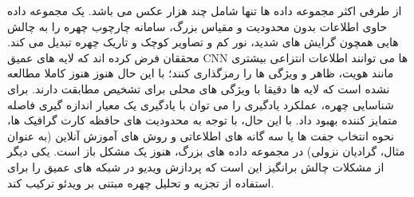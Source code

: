 از طرفی اکثر مجموعه داده ها تنها شامل چند هزار عکس می باشد. یک مجموعه داده حاوی اطلاعات بدون محدودیت و مقیاس بزرگ، سامانه چارچوب چهره را به چالش هایی همچون گرایش های شدید، نور کم و تصاویر کوچک و تاریک چهره تبدیل می کند. محققان فرض کرده اند که لایه های عمیق CNN ها می توانند اطلاعات انتزاعی بیشتری مانند هویت، ظاهر و ویژگی ها را رمزگذاری کنند؛ با این حال هنوز هنوز کاملا مطالعه نشده است که لایه ها دقیقا با ویژگی های محلی برای تشخیص مطابقت دارند.
برای شناسایی چهره، عملکرد یادگیری را می توان با یادگیری یک معیار اندازه گیری فاصله متمایز کننده بهبود داد. با این حال، با توجه به محدودیت های حافظه کارت گرافیک ها، نحوه انتخاب جفت ها یا سه گانه های اطلاعاتی و روش های آموزش آنلاین (به عنوان مثال، گرادیان نزولی) در مجموعه داده های بزرگ، هنوز یک مشکل باز است. یکی دیگر از مشکلات چالش برانگیز این است که پردازش ویدیو در شبکه های عمیق را برای استفاده از تجزیه و تحلیل چهره مبتنی بر ویدئو ترکیب کند.  



